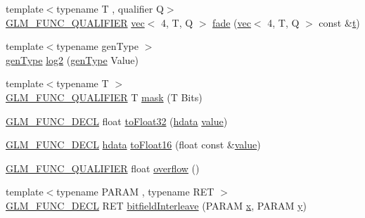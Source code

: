 \begin{DoxyCompactItemize}
\item 
{\footnotesize template$<$typename T , qualifier Q$>$ }\\\hyperlink{setup_8hpp_a33fdea6f91c5f834105f7415e2a64407}{G\+L\+M\+\_\+\+F\+U\+N\+C\+\_\+\+Q\+U\+A\+L\+I\+F\+I\+ER} \hyperlink{structglm_1_1vec}{vec}$<$ 4, T, Q $>$ \hyperlink{namespaceglm_1_1detail_afcf366be6c9ccc0ab6166b7d4b2edea2}{fade} (\hyperlink{structglm_1_1vec}{vec}$<$ 4, T, Q $>$ const \&\hyperlink{_s_d_l__opengl_8h_a7d65d00ca3b0630d9b5c52df855b19f5}{t})
\item 
{\footnotesize template$<$typename gen\+Type $>$ }\\\hyperlink{structglm_1_1detail_1_1gen_type}{gen\+Type} \hyperlink{namespaceglm_1_1detail_a3d24a612f2c5fa4f3aaf97dcd979ef1c}{log2} (\hyperlink{structglm_1_1detail_1_1gen_type}{gen\+Type} Value)
\item 
{\footnotesize template$<$typename T $>$ }\\\hyperlink{setup_8hpp_a33fdea6f91c5f834105f7415e2a64407}{G\+L\+M\+\_\+\+F\+U\+N\+C\+\_\+\+Q\+U\+A\+L\+I\+F\+I\+ER} T \hyperlink{namespaceglm_1_1detail_a048ad00e8777f9f3ebe185ed48857df0}{mask} (T Bits)
\item 
\hyperlink{setup_8hpp_ab2d052de21a70539923e9bcbf6e83a51}{G\+L\+M\+\_\+\+F\+U\+N\+C\+\_\+\+D\+E\+CL} float \hyperlink{namespaceglm_1_1detail_a8e4719d94d99ee1e625496e04317272b}{to\+Float32} (\hyperlink{namespaceglm_1_1detail_aa2115f7dd38e14fea7ba9e95104120f3}{hdata} \hyperlink{_s_d_l__opengl__glext_8h_a8ad81492d410ff2ac11f754f4042150f}{value})
\item 
\hyperlink{setup_8hpp_ab2d052de21a70539923e9bcbf6e83a51}{G\+L\+M\+\_\+\+F\+U\+N\+C\+\_\+\+D\+E\+CL} \hyperlink{namespaceglm_1_1detail_aa2115f7dd38e14fea7ba9e95104120f3}{hdata} \hyperlink{namespaceglm_1_1detail_ac16321696a34b41c55f941b319d50652}{to\+Float16} (float const \&\hyperlink{_s_d_l__opengl__glext_8h_a8ad81492d410ff2ac11f754f4042150f}{value})
\item 
\hyperlink{setup_8hpp_a33fdea6f91c5f834105f7415e2a64407}{G\+L\+M\+\_\+\+F\+U\+N\+C\+\_\+\+Q\+U\+A\+L\+I\+F\+I\+ER} float \hyperlink{namespaceglm_1_1detail_a61efe122333bc00e81c57e0927bfdfb3}{overflow} ()
\item 
{\footnotesize template$<$typename P\+A\+R\+AM , typename R\+ET $>$ }\\\hyperlink{setup_8hpp_ab2d052de21a70539923e9bcbf6e83a51}{G\+L\+M\+\_\+\+F\+U\+N\+C\+\_\+\+D\+E\+CL} R\+ET \hyperlink{namespaceglm_1_1detail_a39644ee418ae41e3393d1cb6191e32a7}{bitfield\+Interleave} (P\+A\+R\+AM \hyperlink{_s_d_l__opengl_8h_ad0e63d0edcdbd3d79554076bf309fd47}{x}, P\+A\+R\+AM \hyperlink{_s_d_l__opengl_8h_a1675d9d7bb68e1657ff028643b4037e3}{y})

\end{DoxyCompactItemize}
